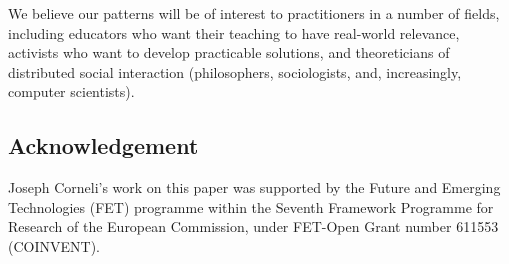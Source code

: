 We believe our patterns will be of interest to practitioners in a number of fields, including educators who want their teaching to have real-world relevance, activists who want to develop practicable solutions, and theoreticians of distributed social interaction (philosophers, sociologists, and, increasingly, computer scientists).

\subsection{Acknowledgement}
Joseph Corneli's work on this paper was supported by the Future and Emerging
Technologies (FET) programme within the Seventh Framework Programme
for Research of the European Commission, under FET-Open Grant number
611553 (COINVENT).

